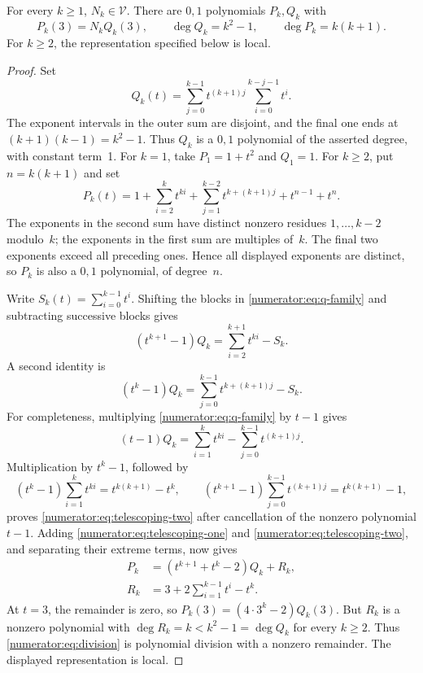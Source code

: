 \begin{theorem}
\label{numerator:local-family}
For every $k\ge1$, $N_k\in\mathcal V$. There are $0,1$ polynomials
$P_k,Q_k$ with
\[
 P_k(3)=N_k Q_k(3),\qquad
 \deg Q_k=k^2-1,\qquad\deg P_k=k(k+1).
\]
For $k\ge2$, the representation specified below is local.
\end{theorem}
\begin{proof}
Set
\begin{equation}\label{numerator:eq:q-family}
 Q_k(t)=\sum_{j=0}^{k-1}t^{(k+1)j}
                         \sum_{i=0}^{k-j-1}t^i.
\end{equation}
The exponent intervals in the outer sum are disjoint, and the final
one ends at $(k+1)(k-1)=k^2-1$. Thus $Q_k$ is a $0,1$ polynomial
of the asserted degree, with constant term~1.
For $k=1$, take $P_1=1+t^2$ and $Q_1=1$.
For $k\ge2$, put $n=k(k+1)$ and set
\begin{equation}\label{numerator:eq:p-family}
 P_k(t)=1+\sum_{i=2}^{k}t^{ki}
       +\sum_{j=1}^{k-2}t^{k+(k+1)j}+t^{n-1}+t^n.
\end{equation}
The exponents in the second sum have distinct nonzero residues
$1,\ldots,k-2$ modulo~$k$; the exponents in the first sum are
multiples of~$k$. The final two exponents exceed all preceding ones.
Hence all displayed exponents are distinct, so $P_k$ is also a
$0,1$ polynomial, of degree~$n$.

Write $S_k(t)=\sum_{i=0}^{k-1}t^i$. Shifting the blocks in
\eqref{numerator:eq:q-family} and subtracting successive blocks gives
\begin{equation}\label{numerator:eq:telescoping-one}
 (t^{k+1}-1)Q_k=\sum_{i=2}^{k+1}t^{ki}-S_k.
\end{equation}
A second identity is
\begin{equation}\label{numerator:eq:telescoping-two}
 (t^k-1)Q_k=\sum_{j=0}^{k-1}t^{k+(k+1)j}-S_k.
\end{equation}
For completeness, multiplying \eqref{numerator:eq:q-family} by $t-1$
gives
\[
 (t-1)Q_k=\sum_{i=1}^{k}t^{ki}
                     -\sum_{j=0}^{k-1}t^{(k+1)j}.
\]
Multiplication by $t^k-1$, followed by
\[
 (t^k-1)\sum_{i=1}^{k}t^{ki}=t^{k(k+1)}-t^k,
 \qquad
 (t^{k+1}-1)\sum_{j=0}^{k-1}t^{(k+1)j}=t^{k(k+1)}-1,
\]
proves \eqref{numerator:eq:telescoping-two} after cancellation of the
nonzero polynomial $t-1$.
Adding \eqref{numerator:eq:telescoping-one} and
\eqref{numerator:eq:telescoping-two}, and separating their extreme
terms, now gives
\begin{equation}\label{numerator:eq:division}
 \begin{split}
 P_k&=(t^{k+1}+t^k-2)Q_k+R_k,\\
 R_k&=3+2\sum_{i=1}^{k-1}t^i-t^k.
 \end{split}
\end{equation}
At $t=3$, the remainder is zero, so
$P_k(3)=(4\cdot3^k-2)Q_k(3)$.
But $R_k$ is a nonzero polynomial with
$\deg R_k=k<k^2-1=\deg Q_k$ for every $k\ge2$.
Thus \eqref{numerator:eq:division} is polynomial division with a
nonzero remainder. The displayed representation is local.
\end{proof}

